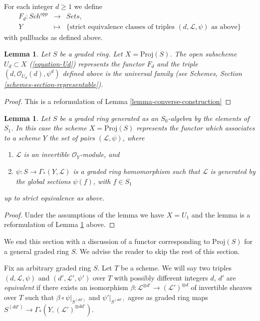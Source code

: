 \documentclass{stacks-project}
\theoremstyle{plain}
\newtheorem{lemma}[subsection]{Lemma}
\theoremstyle{definition}
\theoremstyle{remark}
\numberwithin{equation}{subsection}
\def\Sch{\mathit{Sch}}
\begin{document}
\medskip\noindent
For each integer $d \geq 1$ we define
\begin{eqnarray*}
F_d : \Sch^{opp} & \longrightarrow & \textit{Sets}, \\
Y & \longmapsto &
\{\text{strict equivalence classes of triples }
(d, \mathcal{L}, \psi)
\text{ as above}\}
\end{eqnarray*}
with pullbacks as defined above.

\begin{lemma}
\label{lemma-proj-functor-strict}
Let $S$ be a graded ring.
Let $X = \text{Proj}(S)$.
The open subscheme $U_d \subset X$ (\ref{equation-Ud}) represents the
functor $F_d$ and the triple $(d, \mathcal{O}_{U_d}(d), \psi^d)$
defined above is the universal family (see
Schemes, Section \ref{schemes-section-representable}).
\end{lemma}

\begin{proof}
This is a reformulation of Lemma \ref{lemma-converse-construction}
\end{proof}

\begin{lemma}
\label{lemma-apply}
Let $S$ be a graded ring generated as an $S_0$-algebra by
the elements of $S_1$. In this case the scheme $X = \text{Proj}(S)$
represents the functor which associates to a scheme
$Y$ the set of pairs $(\mathcal{L}, \psi)$, where
\begin{enumerate}
\item $\mathcal{L}$ is an invertible $\mathcal{O}_Y$-module, and
\item $\psi : S \to \Gamma_*(Y, \mathcal{L})$ is a graded
ring homomorphism such that $\mathcal{L}$ is generated by
the global sections $\psi(f)$, with $f \in S_1$
\end{enumerate}
up to strict equivalence as above.
\end{lemma}

\begin{proof}
Under the assumptions of the lemma we have $X = U_1$ and the
lemma is a reformulation of Lemma \ref{lemma-proj-functor-strict} above.
\end{proof}

\noindent
We end this section with a discussion of a functor corresponding
to $\text{Proj}(S)$ for a general graded ring $S$.
We advise the reader to skip the rest of this section.

\medskip\noindent
Fix an arbitrary graded ring $S$. Let $T$ be a scheme.
We will say two triples $(d, \mathcal{L}, \psi)$ and
$(d', \mathcal{L}', \psi')$ over $T$ with possibly different integers
$d$, $d'$ are {\it equivalent} if there exists
an isomorphism
$\beta : \mathcal{L}^{\otimes d'} \to (\mathcal{L}')^{\otimes d}$
of invertible sheaves over $T$
such that $\beta \circ \psi|_{S^{(dd')}}$ and $\psi'|_{S^{(dd')}}$ agree
as graded ring maps $S^{(dd')} \to \Gamma_*(Y, (\mathcal{L}')^{\otimes dd'})$.
\end{document}
